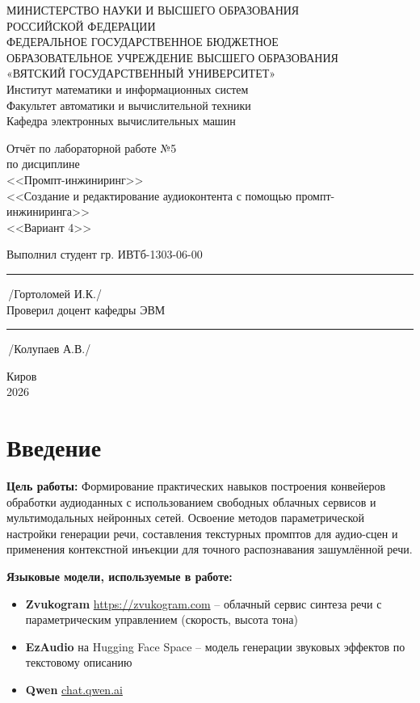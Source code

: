 \documentclass[oneside,a4paper,14pt]{extarticle}
\begin{document}
  \newpage\thispagestyle{empty}
  \begin{center}
    МИНИСТЕРСТВО НАУКИ И ВЫСШЕГО ОБРАЗОВАНИЯ\\
    РОССИЙСКОЙ ФЕДЕРАЦИИ\\
    ФЕДЕРАЛЬНОЕ ГОСУДАРСТВЕННОЕ БЮДЖЕТНОЕ\\
    ОБРАЗОВАТЕЛЬНОЕ УЧРЕЖДЕНИЕ ВЫСШЕГО ОБРАЗОВАНИЯ\\
    «ВЯТСКИЙ ГОСУДАРСТВЕННЫЙ УНИВЕРСИТЕТ»\\
    Институт математики и информационных систем\\
    Факультет автоматики и вычислительной техники\\
    Кафедра электронных вычислительных машин
  \end{center}
  \vspace{20mm}
  \begin{center}
    Отчёт по лабораторной работе №5\\
    по дисциплине\\
    <<Промпт-инжиниринг>>\\
    <<Создание и редактирование аудиоконтента с помощью промпт-инжиниринга>>\\
    <<Вариант 4>>\\
  \end{center}
  \vspace{48mm}
  \noindent
  Выполнил студент гр. ИВТб-1303-06-00 \hfill \rule[-0.5mm]{30mm}{0.15mm}\,/Гортоломей И.К./\\[0.5cm]
  Проверил доцент кафедры ЭВМ \hfill \rule[-0.5mm]{30mm}{0.15mm}\,/Колупаев А.В./
  \vfill
  \begin{center}
    Киров\\
    2026
  \end{center}

\newpage
\thispagestyle{empty}

\section*{Введение}
\noindent\textbf{Цель работы:} Формирование практических навыков построения конвейеров обработки аудиоданных с использованием свободных облачных сервисов и мультимодальных нейронных сетей. Освоение методов параметрической настройки генерации речи, составления текстурных промптов для аудио-сцен и применения контекстной инъекции для точного распознавания зашумлённой речи.

\noindent\textbf{Языковые модели, используемые в работе:}
\begin{itemize}
    \item \textbf{Zvukogram} \url{https://zvukogram.com} -- облачный сервис синтеза речи с параметрическим управлением (скорость, высота тона)
    \item \textbf{EzAudio} на Hugging Face Space -- модель генерации звуковых эффектов по текстовому описанию
    \item \textbf{Qwen} \url{chat.qwen.ai}
\end{itemize}
\end{document}
